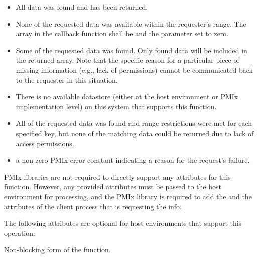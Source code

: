\begin{itemize}
\item {} All data was found and has been returned.

\item {} None of the requested data was available within the requester's range. The  array in the callback function shall be  and the  parameter set to zero.

\item {} Some of the requested data was found.
Only found data will be included in the returned  array. Note that the specific reason for a particular piece of missing information (e.g., lack of permissions) cannot be communicated back to the requester in this situation.

\item {} There is no available datastore (either at the host environment or \ac{PMIx} implementation level) on this system that supports this function.

\item {} All of the requested data was found and range restrictions were met for each specified key, but none of the matching data could be returned due to lack of access permissions.

\item a non-zero \ac{PMIx} error constant indicating a reason for the request's failure.
\end{itemize}

\reqattrstart
\ac{PMIx} libraries are not required to directly support any attributes for this function. However, any provided attributes must be passed to the host environment for processing, and the \ac{PMIx} library is required to add the  and the  attributes of the client process that is requesting the info.

\reqattrend

\optattrstart
The following attributes are optional for host environments that support this operation:


\optattrend

\descr

Non-blocking form of the  function.


